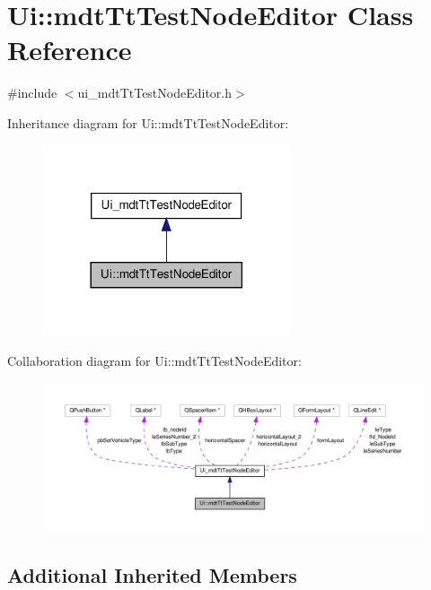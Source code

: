 \hypertarget{class_ui_1_1mdt_tt_test_node_editor}{\section{Ui\-:\-:mdt\-Tt\-Test\-Node\-Editor Class Reference}
\label{class_ui_1_1mdt_tt_test_node_editor}
}


{\ttfamily \#include $<$ui\-\_\-mdt\-Tt\-Test\-Node\-Editor.\-h$>$}



Inheritance diagram for Ui\-:\-:mdt\-Tt\-Test\-Node\-Editor\-:\nopagebreak
\begin{figure}[H]
\begin{center}
\leavevmode
\includegraphics[width=206pt]{class_ui_1_1mdt_tt_test_node_editor__inherit__graph}
\end{center}
\end{figure}


Collaboration diagram for Ui\-:\-:mdt\-Tt\-Test\-Node\-Editor\-:\nopagebreak
\begin{figure}[H]
\begin{center}
\leavevmode
\includegraphics[width=350pt]{class_ui_1_1mdt_tt_test_node_editor__coll__graph}
\end{center}
\end{figure}
\subsection*{Additional Inherited Members}


